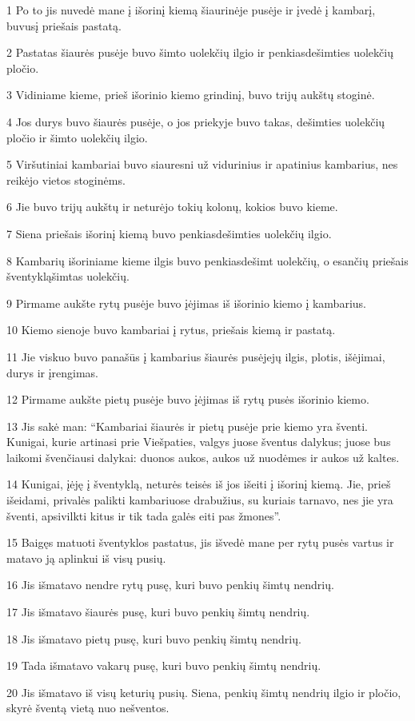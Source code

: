 \par 1 Po to jis nuvedė mane į išorinį kiemą šiaurinėje pusėje ir įvedė į kambarį, buvusį priešais pastatą. 
\par 2 Pastatas šiaurės pusėje buvo šimto uolekčių ilgio ir penkiasdešimties uolekčių pločio. 
\par 3 Vidiniame kieme, prieš išorinio kiemo grindinį, buvo trijų aukštų stoginė. 
\par 4 Jos durys buvo šiaurės pusėje, o jos priekyje buvo takas, dešimties uolekčių pločio ir šimto uolekčių ilgio. 
\par 5 Viršutiniai kambariai buvo siauresni už vidurinius ir apatinius kambarius, nes reikėjo vietos stoginėms. 
\par 6 Jie buvo trijų aukštų ir neturėjo tokių kolonų, kokios buvo kieme. 
\par 7 Siena priešais išorinį kiemą buvo penkiasdešimties uolekčių ilgio. 
\par 8 Kambarių išoriniame kieme ilgis buvo penkiasdešimt uolekčių, o esančių priešais šventyklą­šimtas uolekčių. 
\par 9 Pirmame aukšte rytų pusėje buvo įėjimas iš išorinio kiemo į kambarius. 
\par 10 Kiemo sienoje buvo kambariai į rytus, priešais kiemą ir pastatą. 
\par 11 Jie viskuo buvo panašūs į kambarius šiaurės pusėje­jų ilgis, plotis, išėjimai, durys ir įrengimas. 
\par 12 Pirmame aukšte pietų pusėje buvo įėjimas iš rytų pusės išorinio kiemo. 
\par 13 Jis sakė man: “Kambariai šiaurės ir pietų pusėje prie kiemo yra šventi. Kunigai, kurie artinasi prie Viešpaties, valgys juose šventus dalykus; juose bus laikomi švenčiausi dalykai: duonos aukos, aukos už nuodėmes ir aukos už kaltes. 
\par 14 Kunigai, įėję į šventyklą, neturės teisės iš jos išeiti į išorinį kiemą. Jie, prieš išeidami, privalės palikti kambariuose drabužius, su kuriais tarnavo, nes jie yra šventi, apsivilkti kitus ir tik tada galės eiti pas žmones”. 
\par 15 Baigęs matuoti šventyklos pastatus, jis išvedė mane per rytų pusės vartus ir matavo ją aplinkui iš visų pusių. 
\par 16 Jis išmatavo nendre rytų pusę, kuri buvo penkių šimtų nendrių. 
\par 17 Jis išmatavo šiaurės pusę, kuri buvo penkių šimtų nendrių. 
\par 18 Jis išmatavo pietų pusę, kuri buvo penkių šimtų nendrių. 
\par 19 Tada išmatavo vakarų pusę, kuri buvo penkių šimtų nendrių. 
\par 20 Jis išmatavo iš visų keturių pusių. Siena, penkių šimtų nendrių ilgio ir pločio, skyrė šventą vietą nuo nešventos.



